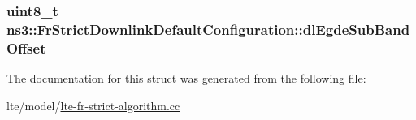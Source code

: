 \subsubsection[{\texorpdfstring{dl\+Egde\+Sub\+Band\+Offset}{dlEgdeSubBandOffset}}]{\setlength{\rightskip}{0pt plus 5cm}uint8\+\_\+t ns3\+::\+Fr\+Strict\+Downlink\+Default\+Configuration\+::dl\+Egde\+Sub\+Band\+Offset}\hypertarget{structns3_1_1FrStrictDownlinkDefaultConfiguration_ab66b35fa9eb29f7b82a63b48616a804a}{}\label{structns3_1_1FrStrictDownlinkDefaultConfiguration_ab66b35fa9eb29f7b82a63b48616a804a}


The documentation for this struct was generated from the following file\+:\begin{DoxyCompactItemize}
\item 
lte/model/\hyperlink{lte-fr-strict-algorithm_8cc}{lte-\/fr-\/strict-\/algorithm.\+cc}\end{DoxyCompactItemize}
